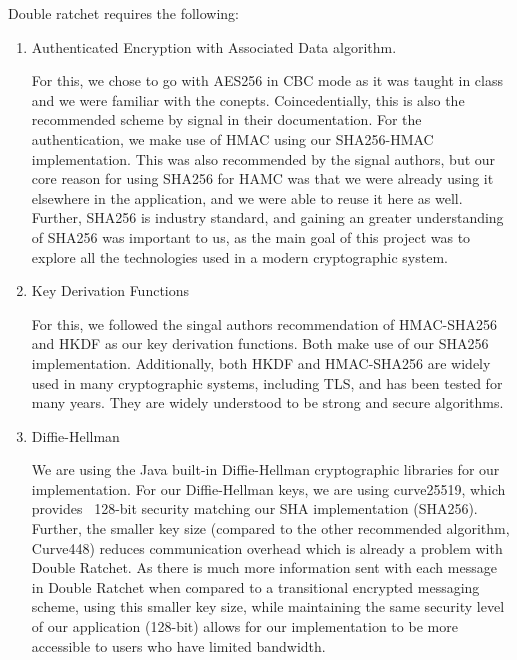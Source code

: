 Double ratchet requires the following:
\begin{enumerate}
    \item Authenticated Encryption with Associated Data algorithm.
        
        For this, we chose to go with AES256 in CBC mode as it was taught in class
        and we were familiar with the conepts. Coincedentially, this is also the recommended 
        scheme by signal in their documentation. For the authentication, we make use of HMAC using 
        our SHA256-HMAC implementation. This was also recommended by the signal authors, but our core
        reason for using SHA256 for HAMC was that we were already using it elsewhere in the application,
        and we were able to reuse it here as well. Further, SHA256 is industry standard, and gaining an 
        greater understanding of SHA256 was important to us, as the main goal of this project was to 
        explore all the technologies used in a modern cryptographic system.

    \item Key Derivation Functions 

        For this, we followed the singal authors recommendation of HMAC-SHA256 and HKDF as our 
        key derivation functions. Both make use of our SHA256 implementation. Additionally,
        both HKDF and HMAC-SHA256 are widely used in many cryptographic systems, including TLS,
        and has been tested for many years. They are widely understood to be strong and secure algorithms.

    \item Diffie-Hellman

        We are using the Java built-in Diffie-Hellman cryptographic libraries for our implementation.
        For our Diffie-Hellman keys, we are using curve25519, which provides ~128-bit security matching our SHA implementation (SHA256).
        Further, the smaller key size (compared to the other recommended algorithm, Curve448) reduces communication
        overhead which is already a problem with Double Ratchet. As there is much more information sent with each message in Double Ratchet 
        when compared to a transitional encrypted messaging scheme, using this smaller key size, while maintaining the same security level of our 
        application (128-bit) allows for our implementation to be more accessible to users who have limited bandwidth.
\end{enumerate}

